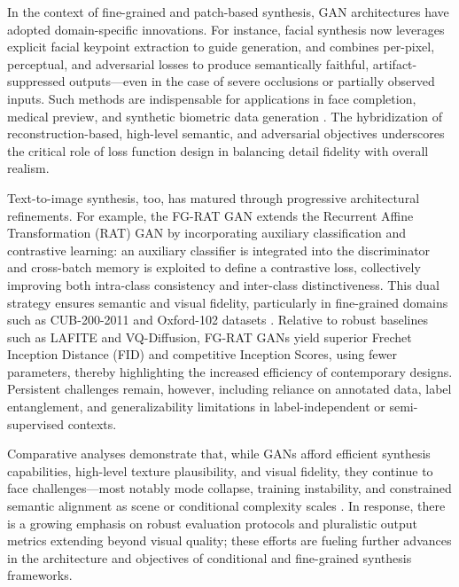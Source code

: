 \documentclass[sigconf]{acmart}
\begin{document}
In the context of fine-grained and patch-based synthesis, GAN architectures have adopted domain-specific innovations. For instance, facial synthesis now leverages explicit facial keypoint extraction to guide generation, and combines per-pixel, perceptual, and adversarial losses to produce semantically faithful, artifact-suppressed outputs---even in the case of severe occlusions or partially observed inputs. Such methods are indispensable for applications in face completion, medical preview, and synthetic biometric data generation \cite{ref97}. The hybridization of reconstruction-based, high-level semantic, and adversarial objectives underscores the critical role of loss function design in balancing detail fidelity with overall realism.

Text-to-image synthesis, too, has matured through progressive architectural refinements. For example, the FG-RAT GAN extends the Recurrent Affine Transformation (RAT) GAN by incorporating auxiliary classification and contrastive learning: an auxiliary classifier is integrated into the discriminator and cross-batch memory is exploited to define a contrastive loss, collectively improving both intra-class consistency and inter-class distinctiveness. This dual strategy ensures semantic and visual fidelity, particularly in fine-grained domains such as CUB-200-2011 and Oxford-102 datasets \cite{ref101}. Relative to robust baselines such as LAFITE and VQ-Diffusion, FG-RAT GANs yield superior Frechet Inception Distance (FID) and competitive Inception Scores, using fewer parameters, thereby highlighting the increased efficiency of contemporary designs. Persistent challenges remain, however, including reliance on annotated data, label entanglement, and generalizability limitations in label-independent or semi-supervised contexts.

Comparative analyses demonstrate that, while GANs afford efficient synthesis capabilities, high-level texture plausibility, and visual fidelity, they continue to face challenges---most notably mode collapse, training instability, and constrained semantic alignment as scene or conditional complexity scales \cite{ref93,ref95,ref101}. In response, there is a growing emphasis on robust evaluation protocols and pluralistic output metrics extending beyond visual quality; these efforts are fueling further advances in the architecture and objectives of conditional and fine-grained synthesis frameworks.
\end{document}
